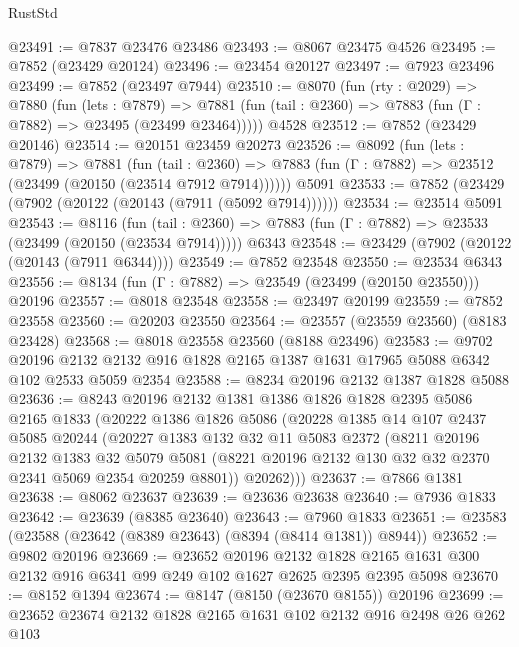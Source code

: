 \begin{lexlean}{RustStd}
\begin{coremodule}
@23491 := @7837 @23476 @23486
@23493 := @8067 @23475 @4526
@23495 := @7852 (@23429 @20124)
@23496 := @23454 @20127
@23497 := @7923 @23496
@23499 := @7852 (@23497 @7944)
@23510 := @8070
    (fun (rty : @2029) =>
    @7880
      (fun (lets : @7879) =>
      @7881 (fun (tail : @2360) => @7883 (fun (Γ : @7882) => @23495 (@23499 @23464)))))
    @4528
@23512 := @7852 (@23429 @20146)
@23514 := @20151 @23459 @20273
@23526 := @8092
    (fun (lets : @7879) =>
    @7881
      (fun (tail : @2360) =>
      @7883 (fun (Γ : @7882) => @23512 (@23499 (@20150 (@23514 @7912 @7914))))))
    @5091
@23533 := @7852 (@23429 (@7902 (@20122 (@20143 (@7911 (@5092 @7914))))))
@23534 := @23514 @5091
@23543 := @8116
    (fun (tail : @2360) => @7883 (fun (Γ : @7882) => @23533 (@23499 (@20150 (@23534 @7914)))))
    @6343
@23548 := @23429 (@7902 (@20122 (@20143 (@7911 @6344))))
@23549 := @7852 @23548
@23550 := @23534 @6343
@23556 := @8134 (fun (Γ : @7882) => @23549 (@23499 (@20150 @23550))) @20196
@23557 := @8018 @23548
@23558 := @23497 @20199
@23559 := @7852 @23558
@23560 := @20203 @23550
@23564 := @23557 (@23559 @23560) (@8183 @23428)
@23568 := @8018 @23558 @23560 (@8188 @23496)
@23583 := @9702
    @20196
    @2132
    @2132
    @916
    @1828
    @2165
    @1387
    @1631
    @17965
    @5088
    @6342
    @102
    @2533
    @5059
    @2354
@23588 := @8234 @20196 @2132 @1387 @1828 @5088
@23636 := @8243
    @20196
    @2132
    @1381
    @1386
    @1826
    @1828
    @2395
    @5086
    @2165
    @1833
    (@20222
      @1386
      @1826
      @5086
      (@20228
        @1385
        @14
        @107
        @2437
        @5085
        @20244
        (@20227
          @1383
          @132
          @32
          @11
          @5083
          @2372
          (@8211
            @20196
            @2132
            @1383
            @32
            @5079
            @5081
            (@8221 @20196 @2132 @130 @32 @32 @2370 @2341 @5069 @2354 @20259 @8801))
          @20262)))
@23637 := @7866 @1381
@23638 := @8062 @23637
@23639 := @23636 @23638
@23640 := @7936 @1833
@23642 := @23639 (@8385 @23640)
@23643 := @7960 @1833
@23651 := @23583 (@23588 (@23642 (@8389 @23643) (@8394 (@8414 @1381)) @8944))
@23652 := @9802 @20196
@23669 := @23652
    @20196
    @2132
    @1828
    @2165
    @1631
    @300
    @2132
    @916
    @6341
    @99
    @249
    @102
    @1627
    @2625
    @2395
    @2395
    @5098
@23670 := @8152 @1394
@23674 := @8147 (@8150 (@23670 @8155)) @20196
@23699 := @23652
    @23674
    @2132
    @1828
    @2165
    @1631
    @102
    @2132
    @916
    @2498
    @26
    @262
    @103

\end{coremodule}
\end{lexlean}
